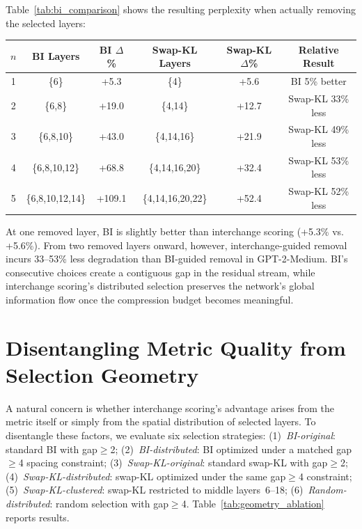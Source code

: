 \documentclass{article}
\newenvironment{tabhere}{%
  \par\medskip
  \begin{center}
}{%
  \end{center}
  \medskip
}
\begin{document}
Table~\ref{tab:bi_comparison} shows the resulting perplexity when actually removing the selected layers:

\begin{tabhere}
\begin{tabular}{cccccc}
\toprule
$n$ & BI Layers & BI $\Delta$\% & Swap-KL Layers & Swap-KL $\Delta$\% & Relative Result \\
\midrule
1 & \{6\} & +5.3 & \{4\} & +5.6 & BI 5\% better \\
2 & \{6,8\} & +19.0 & \{4,14\} & +12.7 & Swap-KL 33\% less \\
3 & \{6,8,10\} & +43.0 & \{4,14,16\} & +21.9 & Swap-KL 49\% less \\
4 & \{6,8,10,12\} & +68.8 & \{4,14,16,20\} & +32.4 & Swap-KL 53\% less \\
5 & \{6,8,10,12,14\} & +109.1 & \{4,14,16,20,22\} & +52.4 & Swap-KL 52\% less \\
\bottomrule
\end{tabular}
\label{tab:bi_comparison}
\end{tabhere}


At one removed layer, BI is slightly better than interchange scoring (+5.3\% vs. +5.6\%). From two removed layers onward, however, interchange-guided removal incurs 33--53\% less degradation than BI-guided removal in GPT-2-Medium. BI's consecutive choices create a contiguous gap in the residual stream, while interchange scoring's distributed selection preserves the network's global information flow once the compression budget becomes meaningful.

\section{Disentangling Metric Quality from Selection Geometry}
\label{sec:app_geometry}

A natural concern is whether interchange scoring's advantage arises from the metric itself or simply from the spatial distribution of selected layers. To disentangle these factors, we evaluate six selection strategies: (1)~\emph{BI-original}: standard BI with gap${\geq}$2; (2)~\emph{BI-distributed}: BI optimized under a matched gap${\geq}$4 spacing constraint; (3)~\emph{Swap-KL-original}: standard swap-KL with gap${\geq}$2; (4)~\emph{Swap-KL-distributed}: swap-KL optimized under the same gap${\geq}$4 constraint; (5)~\emph{Swap-KL-clustered}: swap-KL restricted to middle layers~6--18; (6)~\emph{Random-distributed}: random selection with gap${\geq}$4. Table~\ref{tab:geometry_ablation} reports results.
\end{document}
